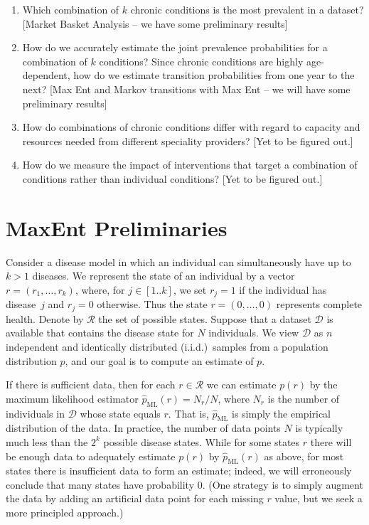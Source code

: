 \documentclass[11pt]{article}
\newcommand{\xD}{\mathcal{D}}
\newcommand{\xR}{\mathcal{R}}
\newcommand{\phat}{\hat{p}}
\begin{document}
\begin{enumerate}
\item Which combination of $k$ chronic conditions is the most prevalent in a dataset? [Market Basket Analysis -- we have some preliminary results]
\item How do we accurately estimate the joint prevalence probabilities for a combination of $k$ conditions? Since chronic conditions are highly age-dependent, how do we estimate transition probabilities from one year to the next? [Max Ent and Markov transitions with Max Ent -- we will have some preliminary results]
\item How do combinations of chronic conditions differ with regard to capacity and resources needed from different speciality providers? [Yet to be figured out.]
\item How do we measure the impact of interventions that target a combination of conditions rather than individual conditions? [Yet to be figured out.]  
\end{enumerate}
 

\section{MaxEnt Preliminaries}

Consider a disease model in which an individual can simultaneously have up to $k> 1$ diseases. We represent the state of an individual by a vector $r=(r_1,\ldots,r_k)$, where, for $j\in[1..k]$, we set $r_j=1$ if the individual has disease~$j$ and $r_j=0$ otherwise. Thus the state $r=(0,\ldots,0)$ represents complete health. Denote by $\xR$ the set of possible states. Suppose that a dataset $\xD$ is available that contains the disease state for $N$ individuals. We view $\xD$ as $n$ independent and identically distributed (i.i.d.)\ samples from a population distribution $p$, and our goal is to compute an estimate of $p$.

If there is sufficient data, then for each $r\in\xR$ we can estimate $p(r)$ by the maximum likelihood estimator $\phat_{\text{ML}}(r)=N_r/N$, where $N_r$ is the number of individuals in $\xD$ whose state equals $r$. That is, $\phat_{\text{ML}}$ is simply the empirical distribution of the data. In practice, the number of data points $N$ is typically much less than the $2^k$ possible disease states. While for some states $r$ there will be enough data to adequately estimate $p(r)$ by $\phat_{\text{ML}}(r)$ as above, for most states there is insufficient data to form an estimate; indeed, we will erroneously conclude that many states have probability 0. (One strategy is to simply augment the data by adding an artificial data point for each missing $r$ value, but we seek a more principled approach.)
\end{document}

